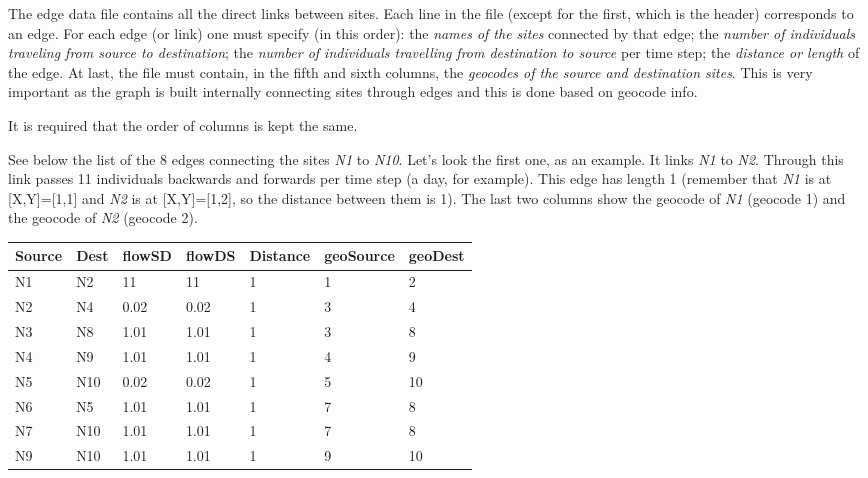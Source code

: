 \documentclass[a4paper,10pt]{manual}
\begin{document}
The edge data file contains all the direct links between sites. Each line in the file (except for the first, which is the header) corresponds to an edge. For each edge (or link) one must specify (in this order): the \emph{names of the sites} connected by that edge; the \emph{number of individuals traveling from source to destination}; the \emph{number of individuals travelling from destination to source} per time step; the \emph{distance or length} of the edge. At last, the file must contain, in the fifth and sixth columns, the \emph{geocodes of the source and destination sites}. This is very important as the graph is built internally connecting sites through edges and this is done based on geocode info.

\begin{notice}[warning]
It is required that the order of columns is kept the same.
\end{notice}

See below the list of the 8 edges connecting the sites \emph{N1} to \emph{N10}. Let's look the first one, as an example. It links \emph{N1} to \emph{N2}. Through this link passes 11 individuals backwards and forwards per time step (a day, for example). This edge has length 1 (remember that \emph{N1} is at {[}X,Y{]}={[}1,1{]} and \emph{N2} is at {[}X,Y{]}={[}1,2{]}, so the distance between them is 1). The last two columns show the geocode of \emph{N1} (geocode 1) and the geocode of \emph{N2} (geocode 2).

\begin{tabulary}{\textwidth}{|L|L|L|L|L|L|L|}
\hline
\textbf{
Source
} & \textbf{
Dest
} & \textbf{
flowSD
} & \textbf{
flowDS
} & \textbf{
Distance
} & \textbf{
geoSource
} & \textbf{
geoDest
}\\
\hline

N1
 & 
N2
 & 
11
 & 
11
 & 
1
 & 
1
 & 
2
\\

N2
 & 
N4
 & 
0.02
 & 
0.02
 & 
1
 & 
3
 & 
4
\\

N3
 & 
N8
 & 
1.01
 & 
1.01
 & 
1
 & 
3
 & 
8
\\

N4
 & 
N9
 & 
1.01
 & 
1.01
 & 
1
 & 
4
 & 
9
\\

N5
 & 
N10
 & 
0.02
 & 
0.02
 & 
1
 & 
5
 & 
10
\\

N6
 & 
N5
 & 
1.01
 & 
1.01
 & 
1
 & 
7
 & 
8
\\

N7
 & 
N10
 & 
1.01
 & 
1.01
 & 
1
 & 
7
 & 
8
\\

N9
 & 
N10
 & 
1.01
 & 
1.01
 & 
1
 & 
9
 & 
10
\\
\hline
\end{tabulary}
\end{document}
